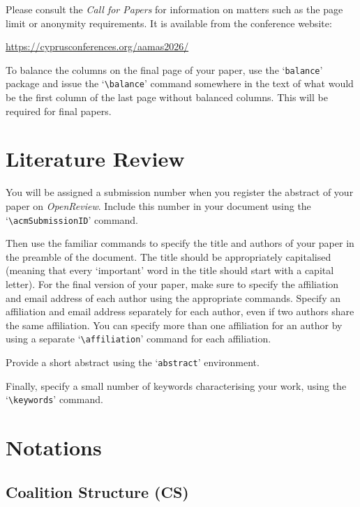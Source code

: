 \documentclass[sigconf,anonymous]{aamas}
\begin{document}
Please consult the \emph{Call for Papers} for information on matters 
such as the page limit or anonymity requirements. It is available from
the conference website:
%
\begin{center}
\url{https://cyprusconferences.org/aamas2026/}
\end{center}
%
To balance the columns on the final page of your paper, use the 
`\texttt{balance}' package and issue the `\verb|\balance|' command
 somewhere in the text of what would be the first column of the last 
 page without balanced columns. This will be required for final papers.


\section{Literature Review}

You will be assigned a submission number when you register the abstract 
of your paper on \textit{OpenReview}. Include this number in your 
document using the `\verb|\acmSubmissionID|' command.

Then use the familiar commands to specify the title and authors of your
paper in the preamble of the document. The title should be appropriately 
capitalised (meaning that every `important' word in the title should 
start with a capital letter). For the final version of your paper, make 
sure to specify the affiliation and email address of each author using 
the appropriate commands. Specify an affiliation and email address 
separately for each author, even if two authors share the same 
affiliation. You can specify more than one affiliation for an author by 
using a separate `\verb|\affiliation|' command for each affiliation.

Provide a short abstract using the `\texttt{abstract}' environment.
 
Finally, specify a small number of keywords characterising your work, 
using the `\verb|\keywords|' command. 


\section{Notations}


\subsection{Coalition Structure (CS)}
\end{document}
